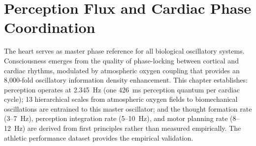 \chapter{Perception Flux and Cardiac Phase Coordination}
\label{ch:perception_flux}


\begin{chapterabstract}
The heart serves as master phase reference for all biological oscillatory systems. Consciousness emerges from the quality of phase-locking between cortical and cardiac rhythms, modulated by atmospheric oxygen coupling that provides an 8,000-fold oscillatory information density enhancement. This chapter establishes: perception operates at 2.345~Hz (one 426~ms perception quantum per cardiac cycle); 13 hierarchical scales from atmospheric oxygen fields to biomechanical oscillations are entrained to this master oscillator; and the thought formation rate (3--7~Hz), perception integration rate (5--10~Hz), and motor planning rate (8--12~Hz) are derived from first principles rather than measured empirically. The athletic performance dataset provides the empirical validation.
\end{chapterabstract}


